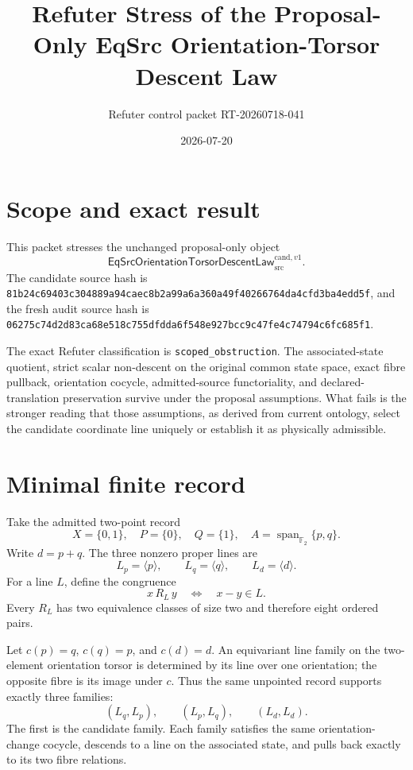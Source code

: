 \documentclass[11pt]{article}
\title{Refuter Stress of the Proposal-Only EqSrc Orientation-Torsor Descent Law}
\author{Refuter control packet RT-20260718-041}
\date{2026-07-20}
\newcommand{\Ftwo}{\mathbb F_2}
\begin{document}
\maketitle

\section{Scope and exact result}

This packet stresses the unchanged proposal-only object
\[
\mathsf{EqSrcOrientationTorsorDescentLaw}^{\mathrm{cand},v1}_{\mathrm{src}}.
\]
The candidate source hash is
\texttt{81b24c69403c304889a94caec8b2a99a6a360a49f40266764da4cfd3ba4edd5f},
and the fresh audit source hash is
\texttt{06275c74d2d83ca68e518c755dfdda6f548e927bcc9c47fe4c74794c6fc685f1}.

The exact Refuter classification is \texttt{scoped\_obstruction}. The
associated-state quotient, strict scalar non-descent on the original common
state space, exact fibre pullback, orientation cocycle, admitted-source
functoriality, and declared-translation preservation survive under the
proposal assumptions. What fails is the stronger reading that those
assumptions, as derived from current ontology, select the candidate coordinate
line uniquely or establish it as physically admissible.

\section{Minimal finite record}

Take the admitted two-point record
\[
X=\{0,1\},\quad P=\{0\},\quad Q=\{1\},\quad
A=\operatorname{span}_{\Ftwo}\{p,q\}.
\]
Write \(d=p+q\). The three nonzero proper lines are
\[
L_p=\langle p\rangle,\qquad
L_q=\langle q\rangle,\qquad
L_d=\langle d\rangle.
\]
For a line \(L\), define the congruence
\[
x\,R_L\,y\quad\Longleftrightarrow\quad x-y\in L.
\]
Every \(R_L\) has two equivalence classes of size two and therefore eight
ordered pairs.

Let \(c(p)=q\), \(c(q)=p\), and \(c(d)=d\). An equivariant line family on the
two-element orientation torsor is determined by its line over one
orientation; the opposite fibre is its image under \(c\). Thus the same
unpointed record supports exactly three families:
\[
(L_q,L_p),\qquad(L_p,L_q),\qquad(L_d,L_d).
\]
The first is the candidate family. Each family satisfies the same
orientation-change cocycle, descends to a line on the associated state, and
pulls back exactly to its two fibre relations.
\end{document}
